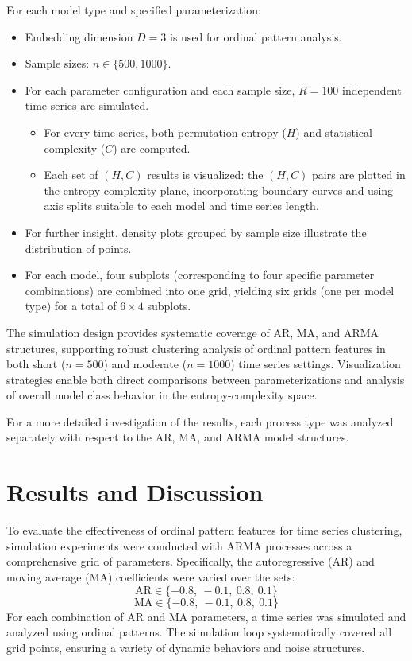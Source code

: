 \documentclass[12pt,a4paper]{article}
\begin{document}
For each model type and specified parameterization:
\begin{itemize}
	\item Embedding dimension $D=3$ is used for ordinal pattern analysis.
	\item Sample sizes: $n \in \{500, 1000\}$.
	\item For each parameter configuration and each sample size, $R=100$ independent time series are simulated.
	\begin{itemize}
	\item For every time series, both permutation entropy ($H$) and statistical complexity ($C$) are computed.
	\item Each set of $(H, C)$ results is visualized: the $(H, C)$  pairs are plotted in the entropy-complexity plane, incorporating boundary curves and using axis splits suitable to each model and time series length.
	\end{itemize}
	\item For further insight, density plots grouped by sample size illustrate the distribution of points.
	\item For each model, four subplots (corresponding to four specific parameter combinations) are combined into one grid, yielding six grids (one per model type) for a total of $6 \times 4$ subplots.
\end{itemize}

The simulation design provides systematic coverage of AR, MA, and ARMA structures, supporting robust clustering analysis of ordinal pattern features in both short ($n=500$) and moderate ($n=1000$) time series settings. Visualization strategies enable both direct comparisons between parameterizations and analysis of overall model class behavior in the entropy-complexity space.

For a more detailed investigation of the results, each process type was analyzed separately with respect to the AR, MA, and ARMA model structures.


\section{Results and Discussion}

To evaluate the effectiveness of ordinal pattern features for time series clustering, simulation experiments were conducted with ARMA processes across a comprehensive grid of parameters. Specifically, the autoregressive (AR) and moving average (MA) coefficients were varied over the sets:
\[
\text{AR} \in \{-0.8,\ -0.1,\ 0.8,\ 0.1 \}
\]
\[
\text{MA} \in \{-0.8,\ -0.1,\ 0.8,\ 0.1 \}
\]
For each combination of AR and MA parameters, a time series was simulated and analyzed using ordinal patterns. The simulation loop systematically covered all grid points, ensuring a variety of dynamic behaviors and noise structures.
\end{document}
